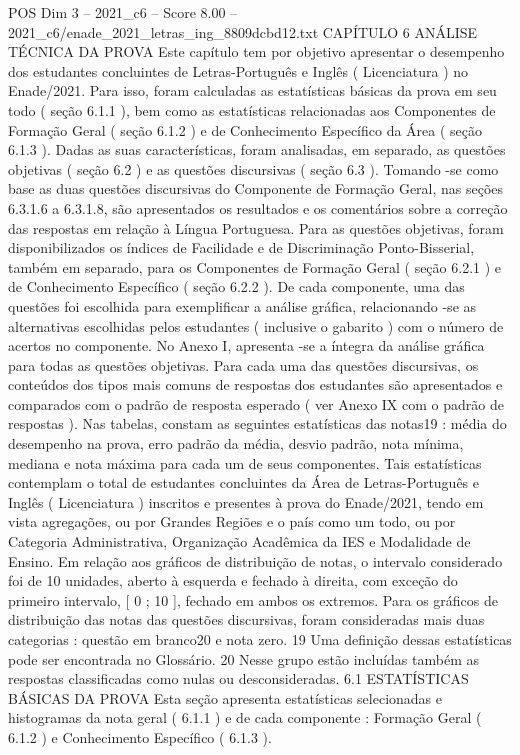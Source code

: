 \begin{textsample}{POS Dim 3 – 2021\_c6 – Score 8.00 – 2021\_c6/enade\_2021\_letras\_ing\_8809dcbd12.txt}  \label{ex:f3_pos_042}
CAPÍTULO 6 ANÁLISE TÉCNICA DA PROVA Este capítulo tem por objetivo apresentar o desempenho dos estudantes concluintes de Letras-Português e Inglês ( Licenciatura ) no Enade/2021.
Para isso, foram calculadas as estatísticas básicas da prova em seu todo ( seção 6.1.1 ), bem como as estatísticas relacionadas aos Componentes de Formação Geral ( seção 6.1.2 ) e de Conhecimento Específico da Área ( seção 6.1.3 ).
Dadas as suas características, foram analisadas, em separado, as questões objetivas ( seção 6.2 ) e as questões discursivas ( seção 6.3 ).
Tomando -se como base as duas questões discursivas do Componente de Formação Geral, nas seções 6.3.1.6 a 6.3.1.8, são apresentados os resultados e os comentários sobre a correção das respostas em relação à Língua Portuguesa.
Para as questões objetivas, foram disponibilizados os índices de Facilidade e de Discriminação Ponto-Bisserial, também em separado, para os Componentes de Formação Geral ( seção 6.2.1 ) e de Conhecimento Específico ( seção 6.2.2 ).
De cada componente, uma das questões foi escolhida para exemplificar a análise gráfica, relacionando -se as alternativas escolhidas pelos estudantes ( inclusive o gabarito ) com o número de acertos no componente.
No Anexo I, apresenta -se a íntegra da análise gráfica para todas as questões objetivas.
Para cada uma das questões discursivas, os conteúdos dos tipos mais comuns de respostas dos estudantes são apresentados e comparados com o padrão de resposta esperado ( ver Anexo IX com o padrão de respostas ).
Nas tabelas, constam as seguintes estatísticas das notas19 : média do desempenho na prova, erro padrão da média, desvio padrão, nota mínima, mediana e nota máxima para cada um de seus componentes.
Tais estatísticas contemplam o total de estudantes concluintes da Área de Letras-Português e Inglês ( Licenciatura ) inscritos e presentes à prova do Enade/2021, tendo em vista agregações, ou por Grandes Regiões e o país como um todo, ou por Categoria Administrativa, Organização Acadêmica da IES e Modalidade de Ensino.
Em relação aos gráficos de distribuição de notas, o intervalo considerado foi de 10 unidades, aberto à esquerda e fechado à direita, com exceção do primeiro intervalo, [ 0 ; 10 ], fechado em ambos os extremos.
Para os gráficos de distribuição das notas das questões discursivas, foram consideradas mais duas categorias : questão em branco20 e nota zero. 19 Uma definição dessas estatísticas pode ser encontrada no Glossário. 20 Nesse grupo estão incluídas também as respostas classificadas como nulas ou desconsideradas. 6.1 ESTATÍSTICAS BÁSICAS DA PROVA Esta seção apresenta estatísticas selecionadas e histogramas da nota geral ( 6.1.1 ) e de cada componente : Formação Geral ( 6.1.2 ) e Conhecimento Específico ( 6.1.3 ).

\end{textsample}
